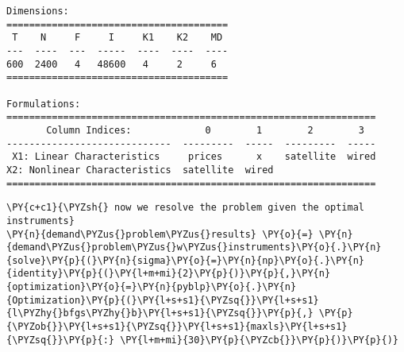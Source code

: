 \begin{Verbatim}[commandchars=\\\{\}]
Dimensions:
=======================================
 T    N     F     I     K1    K2    MD
---  ----  ---  -----  ----  ----  ----
600  2400   4   48600   4     2     6
=======================================

Formulations:
=================================================================
       Column Indices:             0        1        2        3
-----------------------------  ---------  -----  ---------  -----
 X1: Linear Characteristics     prices      x    satellite  wired
X2: Nonlinear Characteristics  satellite  wired
=================================================================
    \end{Verbatim}

    \begin{tcolorbox}[breakable, size=fbox, boxrule=1pt, pad at break*=1mm,colback=cellbackground, colframe=cellborder]
\begin{Verbatim}[commandchars=\\\{\}]
\PY{c+c1}{\PYZsh{} now we resolve the problem given the optimal instruments}
\PY{n}{demand\PYZus{}problem\PYZus{}results} \PY{o}{=} \PY{n}{demand\PYZus{}problem\PYZus{}w\PYZus{}instruments}\PY{o}{.}\PY{n}{solve}\PY{p}{(}\PY{n}{sigma}\PY{o}{=}\PY{n}{np}\PY{o}{.}\PY{n}{identity}\PY{p}{(}\PY{l+m+mi}{2}\PY{p}{)}\PY{p}{,}\PY{n}{optimization}\PY{o}{=}\PY{n}{pyblp}\PY{o}{.}\PY{n}{Optimization}\PY{p}{(}\PY{l+s+s1}{\PYZsq{}}\PY{l+s+s1}{l\PYZhy{}bfgs\PYZhy{}b}\PY{l+s+s1}{\PYZsq{}}\PY{p}{,} \PY{p}{\PYZob{}}\PY{l+s+s1}{\PYZsq{}}\PY{l+s+s1}{maxls}\PY{l+s+s1}{\PYZsq{}}\PY{p}{:} \PY{l+m+mi}{30}\PY{p}{\PYZcb{}}\PY{p}{)}\PY{p}{)}
\end{Verbatim}
\end{tcolorbox}

